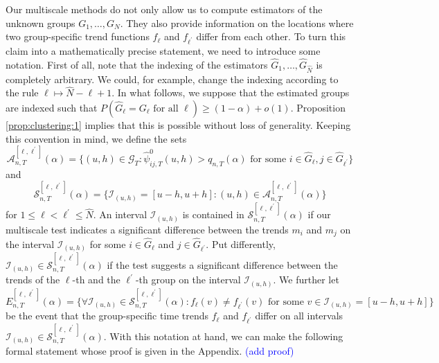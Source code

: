 \documentclass[a4paper,12pt]{article}
\begin{document}
Our multiscale methods do not only allow us to compute estimators of the unknown groups $G_1,\ldots, G_N$. They also provide information on the locations where two group-specific trend functions $f_\ell$ and $f_{\ell^\prime}$ differ from each other. To turn this claim into a mathematically precise statement, we need to introduce some notation. First of all, note that the indexing of the estimators $\widehat{G}_1,\ldots,\widehat{G}_{\widehat{N}}$ is completely arbitrary. We could, for example, change the indexing according to the rule $\ell \mapsto \widehat{N} - \ell + 1$. In what follows, we suppose that the estimated groups are indexed such that $P( \widehat{G}_\ell = G_\ell \text{ for all } \ell ) \ge (1-\alpha) + o(1)$. Proposition \ref{prop:clustering:1} implies that this is possible without loss of generality. Keeping this convention in mind, we define the sets 
{\color{red}\[ \mathcal{A}_{n,T}^{[\ell,\ell^\prime]}(\alpha)= \Big\{ (u, h) \in \mathcal{G}_T: \widehat{\psi}^0_{ij, T}(u, h) > q_{n,T}(\alpha) \text{ for some } i \in \widehat{G}_\ell, j \in \widehat{G}_{\ell^\prime} \Big\} \]
and  
\[ \mathcal{S}^{[\ell,\ell^\prime]}_{n, T}(\alpha) = \big\{ \mathcal{I}_{(u, h)} = [u-h, u+h]: (u, h) \in \mathcal{A}_{n,T}^{[\ell,\ell^\prime]}(\alpha) \big\} \]
for $1 \le \ell < \ell^\prime \le \widehat{N}$. An interval $\mathcal{I}_{(u, h)}$ is contained in $\mathcal{S}^{[\ell,\ell^\prime]}_{n, T}(\alpha)$ if our multiscale test indicates a significant difference between the trends $m_i$ and $m_j$ on the interval $\mathcal{I}_{(u, h)}$ for some $i \in \widehat{G}_\ell$ and $j \in \widehat{G}_{\ell^\prime}$. Put differently, $\mathcal{I}_{(u, h)} \in \mathcal{S}^{[\ell,\ell^\prime]}_{n, T}(\alpha)$ if the test suggests a significant difference between the trends of the $\ell$-th and the $\ell^\prime$-th group on the interval $\mathcal{I}_{(u, h)}$. We further let
\[ E_{n,T}^{[\ell,\ell^\prime]}(\alpha) = \Big\{ \forall \mathcal{I}_{(u, h)} \in \mathcal{S}^{[\ell,\ell^\prime]}_{n, T}(\alpha): f_\ell(v) \ne f_{\ell^\prime}(v) \text{ for some } v \in \mathcal{I}_{(u, h)} = [u-h, u+h] \Big\} \]
be the event that the group-specific time trends $f_\ell$ and $f_{\ell^\prime}$ differ on all intervals $\mathcal{I}_{(u, h)} \in \mathcal{S}^{[\ell,\ell^\prime]}_{n, T}(\alpha)$.} With this notation at hand, we can make the following formal statement whose proof is given in the Appendix. \textcolor{blue}{(add proof)} 
\end{document}
